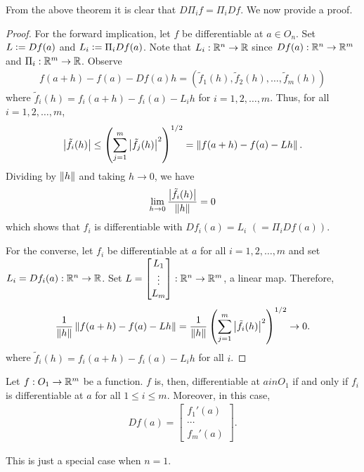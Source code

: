 From the above theorem it is clear that $D\Pi_{i}f = \Pi_{i}Df$. We now provide a proof.
\begin{proof}
    For the forward implication, let $f$ be differentiable at $a \in O_{n}$. Set $L \vcentcolon= Df(a)$ and $L_{i} \vcentcolon= \Pi_{i}Df(a)$. Note that $L_{i}:\mathbb{R}^{n} \to \mathbb{R}$ since $Df(a):\mathbb{R}^{n}\to\mathbb{R}^{m}$ and $\Pi_{i}:\mathbb{R}^{m} \to \mathbb{R}$. Observe
    \begin{align}
        f(a+h) - f(a) - Df(a)h = (\tilde{f}_{1}(h),\tilde{f}_{2}(h),\ldots,\tilde{f}_{m}(h))
    \end{align}
    where $\tilde{f}_{i}(h) = f_{i}(a+h)-f_{i}(a)-L_{i}h$ for $i = 1,2,\ldots,m$. Thus, for all $i = 1,2,\ldots,m$,
    \begin{align}
        \left| \tilde{f}_{i}(h) \right| \leq \left( \sum_{j=1}^{m} \left| \tilde{f}_{j}(h) \right|^{2} \right)^{1/2} = \left\lVert f(a+h)-f(a)-Lh\right\rVert.
    \end{align}
    Dividing by $\left\lVert h\right\rVert$ and taking $h \to 0$, we have
    \begin{align}
        \lim_{h \to 0} \frac{\left| \tilde{f}_{i}(h) \right|}{\left\lVert h\right\rVert} = 0
    \end{align}
    which shows that $f_{i}$ is differentiable with $Df_{i}(a) = L_{i}$ $(=\Pi_{i}Df(a))$.

    For the converse, let $f_{i}$ be differentiable at $a$ for all $i = 1,2,\ldots,m$ and set $L_{i} = Df_{i}(a):\mathbb{R}^{n}\to\mathbb{R}$. Set $L = \begin{bmatrix}
        L_{1} \\ \vdots \\ L_{m}
    \end{bmatrix}:\mathbb{R}^{n} \to \mathbb{R}^{m}$, a linear map. Therefore,
    \begin{align}
        \frac{1}{\left\lVert h\right\rVert} \left\lVert f(a+h)-f(a)-Lh\right\rVert = \frac{1}{\left\lVert h\right\rVert} \left( \sum_{j=1}^{m} \left| \tilde{f}_{i}(h) \right|^{2} \right)^{1/2} \to 0.
    \end{align}
    where $\tilde{f}_{i}(h) = f_{i}(a+h) - f_{i}(a) - L_{i}h$ for all $i$.
\end{proof}

\begin{corollary}
    Let $f:O_{1} \to \mathbb{R}^{m}$ be a function. $f$ is, then, differentiable at $a in O_{1}$ if and only if $f_{i}$ is differentiable at $a$ for all $1 \leq i \leq m$. Moreover, in this case,
    \begin{align}
        Df(a) = \begin{bmatrix}
            f_{1}'(a) \\ \cdots \\ f_{m}'(a)
        \end{bmatrix}.
    \end{align}
\end{corollary}
This is just a special case when $n = 1$.


